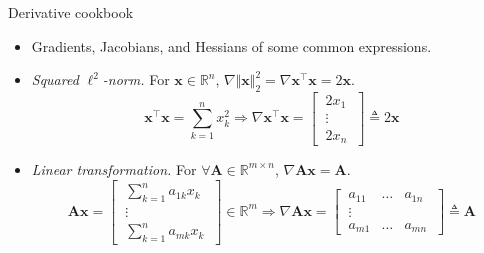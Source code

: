 \documentclass{beamer}
\numberwithin{equation}{section}
\begin{document}
\begin{frame}{Derivative cookbook}
    \begin{itemize}
        \item
	    Gradients, Jacobians, and Hessians of some common expressions.
	
	    \item
	    \textit{Squared} $ \ell^2 $\textit{-norm.} For $ \mathbf{x} \in
	    \mathbb{R}^n $, $ \nabla \Vert\mathbf{x}\Vert_2^2 =
	    \nabla\mathbf{x}^\top\mathbf{x} = 2\mathbf{x} $.
	    \begin{equation*}
            \mathbf{x}^\top\mathbf{x} = \sum_{k = 1}^nx_k^2 \Rightarrow
            \nabla \mathbf{x}^\top\mathbf{x} = \begin{bmatrix}
                \ 2x_1 \ \\ \ \vdots \ \\ \ 2x_n \
            \end{bmatrix} \triangleq 2\mathbf{x}
	    \end{equation*}

        \item
        \textit{Linear transformation.} For $ \forall \mathbf{A} \in
        \mathbb{R}^{m \times n} $, $ \nabla \mathbf{Ax} = \mathbf{A} $.
        \begin{equation*}
            \mathbf{Ax} = \begin{bmatrix}
                \ \sum_{k = 1}^na_{1k}x_k \ \\ \ \vdots \ \\
                \ \sum_{k = 1}^na_{mk}x_k \
            \end{bmatrix} \in \mathbb{R}^m \Rightarrow
            \nabla\mathbf{Ax} = \begin{bmatrix}
                \ a_{11} & \ldots & a_{1n} \ \\ \ \vdots \ \\
                \ a_{m1} & \ldots & a_{mn} \ 
            \end{bmatrix} \triangleq \mathbf{A}
        \end{equation*}
    \end{itemize}
\end{frame}
\end{document}
